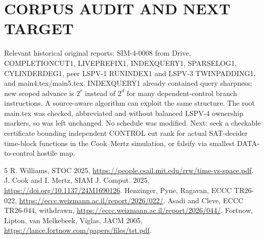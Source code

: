 \documentclass[11pt]{article}
\begin{document}
\section{CORPUS AUDIT AND NEXT TARGET}
Relevant historical original reports: SIM-4-0008 from Drive, COMPLETIONCUT1, LIVEPREFIX1, INDEXQUERY1, SPARSELOG1, CYLINDERDEG1, peer LSPV-1 RUNINDEX1 and LSPV-3 TWINPADDING1, and main4.tex/main5.tex. INDEXQUERY1 already contained query sharpness; new scoped advance is $2^r$ instead of $2^d$ for many dependent-control branch instructions. A source-aware algorithm can exploit the same structure. The root main.tex was checked, abbreviated and without balanced LSPV-4 ownership markers, so was left unchanged. No schedule was modified.
Next: seek a checkable certificate bounding independent CONTROL cut rank for actual SAT-decider time-block functions in the Cook--Mertz simulation, or falsify via smallest DATA-to-control hostile map.
\begin{thebibliography}{5}
 R. Williams, STOC 2025, \url{https://people.csail.mit.edu/rrw/time-vs-space.pdf}.
 J. Cook and I. Mertz, SIAM J. Comput. 2025, \url{https://doi.org/10.1137/24M1690126}.
 Henzinger, Pyne, Ragavan, ECCC TR26-022, \url{https://eccc.weizmann.ac.il/report/2026/022/}.
 Asadi and Cleve, ECCC TR26-044, withdrawn, \url{https://eccc.weizmann.ac.il/report/2026/044/}.
 Fortnow, Lipton, van Melkebeek, Viglas, JACM 2005, \url{https://lance.fortnow.com/papers/files/tst.pdf}.
\end{thebibliography}
\end{document}
